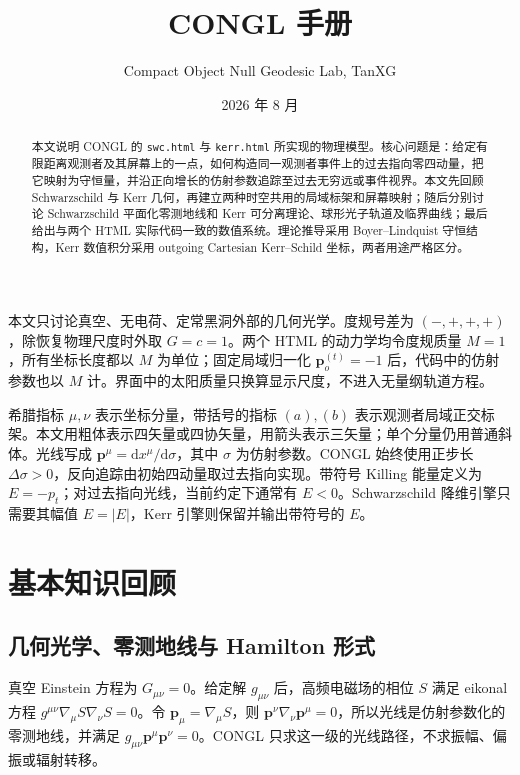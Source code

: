 \documentclass[UTF8,11pt,a4paper,fontset=fandol]{ctexart}
\title{\bfseries CONGL 手册\\[0.35em]}
\author{Compact Object Null Geodesic Lab, TanXG}
\date{2026 年 8 月}
\newcommand{\dd}{\mathrm{d}}
\begin{document}
\maketitle

\begin{abstract}
本文说明 CONGL 的 \texttt{swc.html} 与 \texttt{kerr.html} 所实现的物理模型。核心问题是：给定有限距离观测者及其屏幕上的一点，如何构造同一观测者事件上的过去指向零四动量，把它映射为守恒量，并沿正向增长的仿射参数追踪至过去无穷远或事件视界。本文先回顾 Schwarzschild 与 Kerr 几何，再建立两种时空共用的局域标架和屏幕映射；随后分别讨论 Schwarzschild 平面化零测地线和 Kerr 可分离理论、球形光子轨道及临界曲线；最后给出与两个 HTML 实际代码一致的数值系统。理论推导采用 Boyer--Lindquist 守恒结构，Kerr 数值积分采用 outgoing Cartesian Kerr--Schild 坐标，两者用途严格区分。
\end{abstract}

\tableofcontents
\newpage

本文只讨论真空、无电荷、定常黑洞外部的几何光学。度规号差为 \((-,+,+,+)\)，除恢复物理尺度时外取 \(G=c=1\)。两个 HTML 的动力学均令度规质量 \(M=1\)，所有坐标长度都以 \(M\) 为单位；固定局域归一化 \(\bm{p}_o^{(t)}=-1\) 后，代码中的仿射参数也以 \(M\) 计。界面中的太阳质量只换算显示尺度，不进入无量纲轨道方程。

希腊指标 \(\mu,\nu\) 表示坐标分量，带括号的指标 \((a),(b)\) 表示观测者局域正交标架。本文用粗体表示四矢量或四协矢量，用箭头表示三矢量；单个分量仍用普通斜体。光线写成 \(\bm{p}^\mu=\dd x^\mu/\dd\sigma\)，其中 \(\sigma\) 为仿射参数。CONGL 始终使用正步长 \(\Delta\sigma>0\)，反向追踪由初始四动量取过去指向实现。带符号 Killing 能量定义为 \(E=-p_t\)；对过去指向光线，当前约定下通常有 \(E<0\)。Schwarzschild 降维引擎只需要其幅值 \(E=|E|\)，Kerr 引擎则保留并输出带符号的 \(E\)。

\section{基本知识回顾}

\subsection{几何光学、零测地线与 Hamilton 形式}

真空 Einstein 方程为 \(G_{\mu\nu}=0\)。给定解 \(g_{\mu\nu}\) 后，高频电磁场的相位 \(S\) 满足 eikonal 方程 \(g^{\mu\nu}\nabla_\mu S\nabla_\nu S=0\)。令 \(\bm{p}_\mu=\nabla_\mu S\)，则 \(\bm{p}^\nu\nabla_\nu\bm{p}^\mu=0\)，所以光线是仿射参数化的零测地线，并满足 \(g_{\mu\nu}\bm{p}^\mu\bm{p}^\nu=0\)。CONGL 只求这一级的光线路径，不求振幅、偏振或辐射转移。
\end{document}
